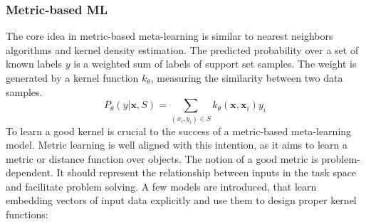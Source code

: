 \documentclass[main]{subfiles}
\begin{document}
\subsubsection{Metric-based ML}
The core idea in metric-based meta-learning is similar to nearest neighbors algorithms and kernel density estimation. The predicted probability over a set of known labels $y$ is a weighted sum of labels of support set samples. The weight is generated by a kernel function $k_\theta$, measuring the similarity between two data samples.
%
\begin{equation}
P_{\theta}(y | \mathbf{x}, S)=\sum_{\left(x_{i}, y_{i}\right) \in S} k_{\theta}\left(\mathbf{x}, \mathbf{x}_{i}\right) y_{i}
\end{equation}
%
To learn a good kernel is crucial to the success of a metric-based meta-learning model. Metric learning is well aligned with this intention, as it aims to learn a metric or distance function over objects. The notion of a good metric is problem-dependent. It should represent the relationship between inputs in the task space and facilitate problem solving. A few models are introduced, that learn embedding vectors of input data explicitly and use them to design proper kernel functions:
\end{document}
